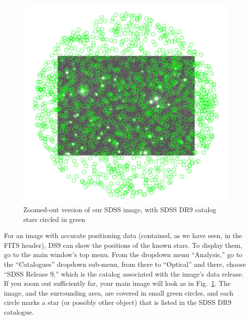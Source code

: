\documentclass[twocolumn,apj]{openjournal}
\begin{document}
\begin{figure}[htbp]
\begin{center}
\includegraphics[width=\linewidth]{sdss-green.jpg}
\caption{Zoomed-out version of our SDSS image, with SDSS DR9 catalog stars circled in green}
\label{SDSS9src}
\end{center}
\end{figure}
For an image with accurate positioning data (contained, as we have seen, in the FITS header), DS9 can show the positions of the known stars. To display them, go to the main window's top menu. From the dropdown menu ``Analysis,'' go to the ``Catalogues'' dropdown sub-menu, from there to ``Optical'' and there, choose ``SDSS Release 9,'' which is the catalog associated with the image's data release. If you zoom out sufficiently far, your main image will look as in Fig.~\ref{SDSS9src}. The image, and the surrounding area, are covered in small green circles, and each circle marks a star (or possibly other object) that is listed in the SDSS DR9 catalogue.
\end{document}
